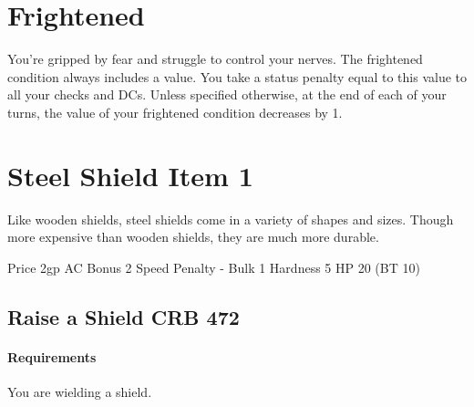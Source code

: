 \documentclass[paper=63mm:88mm, DIV=15, fontsize=8pt]{scrartcl}
\begin{document}
\pagestyle{empty}



\setlength\parindent{0pt} %
\setlength\parskip{4pt} %


\renewcommand*{\sectionformat}{}
\renewcommand*{\subsectionformat}{}

\newcommand{\Item}[2]{\section{#2 \hfill Item #1}}
\newcommand{\Action}[4]{\subsection[#4]{#4 \ActionSymbol{#3} \hfill {\normalfont \small #1 #2}}}

\newcommand{\Requirements}[1]{\paragraph{Requirements} #1.}
\newcommand{\WeaponDamage}[1]{\textbf{Damage} #1}
\newcommand{\ItemHands}[1]{\textbf{Hands} #1}
\newcommand{\WeaponType}[1]{\textbf{Type} #1}
\newcommand{\WeaponCategory}[1]{\textbf{Category} #1}
\newcommand{\WeaponGroup}[1]{\textbf{Group} #1}

\newcommand{\Reference}[2]{{\small #1 #2}}


\section{Frightened}

You're gripped by fear and struggle to control your nerves.
The frightened condition always includes a value.
You take a status penalty equal to this value to all your checks and DCs.
Unless specified otherwise, at the end of each of your turns, the value of your frightened condition decreases by 1.

\Item{1}{Steel Shield}

Like wooden shields, steel shields come in a variety of shapes and sizes. Though more expensive than wooden shields, they are much more durable.

Price 2gp
AC Bonus 2
Speed Penalty -
Bulk 1
Hardness 5
HP 20 (BT 10)

\Action{CRB}{472}{1}{Raise a Shield}

\Requirements{You are wielding a shield}
\end{document}
